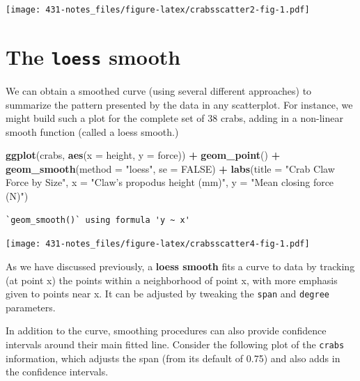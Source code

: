 \documentclass[
]{book}
\newenvironment{Shaded}{\begin{snugshade}}{\end{snugshade}}
\newcommand{\DataTypeTok}[1]{\textcolor[rgb]{0.13,0.29,0.53}{#1}}
\newcommand{\KeywordTok}[1]{\textcolor[rgb]{0.13,0.29,0.53}{\textbf{#1}}}
\newcommand{\NormalTok}[1]{#1}
\newcommand{\OperatorTok}[1]{\textcolor[rgb]{0.81,0.36,0.00}{\textbf{#1}}}
\newcommand{\OtherTok}[1]{\textcolor[rgb]{0.56,0.35,0.01}{#1}}
\newcommand{\StringTok}[1]{\textcolor[rgb]{0.31,0.60,0.02}{#1}}
\begin{document}
\texttt{[image: 431-notes\_files/figure-latex/crabsscatter2-fig-1.pdf]}

\hypertarget{loess_smooth}{%
\section{\texorpdfstring{The \texttt{loess} smooth}{The loess smooth}}\label{loess_smooth}}

We can obtain a smoothed curve (using several different approaches) to summarize the pattern presented by the data in any scatterplot. For instance, we might build such a plot for the complete set of 38 crabs, adding in a non-linear smooth function (called a loess smooth.)

\begin{Shaded}
\begin{Highlighting}[]
\KeywordTok{ggplot}\NormalTok{(crabs, }\KeywordTok{aes}\NormalTok{(}\DataTypeTok{x =}\NormalTok{ height, }\DataTypeTok{y =}\NormalTok{ force)) }\OperatorTok{+}
\StringTok{    }\KeywordTok{geom_point}\NormalTok{() }\OperatorTok{+}
\StringTok{    }\KeywordTok{geom_smooth}\NormalTok{(}\DataTypeTok{method =} \StringTok{"loess"}\NormalTok{, }\DataTypeTok{se =} \OtherTok{FALSE}\NormalTok{) }\OperatorTok{+}
\StringTok{    }\KeywordTok{labs}\NormalTok{(}\DataTypeTok{title =} \StringTok{"Crab Claw Force by Size"}\NormalTok{, }
         \DataTypeTok{x =} \StringTok{"Claw's propodus height (mm)"}\NormalTok{, }\DataTypeTok{y =} \StringTok{"Mean closing force (N)"}\NormalTok{)}
\end{Highlighting}
\end{Shaded}

\begin{verbatim}
`geom_smooth()` using formula 'y ~ x'
\end{verbatim}

\texttt{[image: 431-notes\_files/figure-latex/crabsscatter4-fig-1.pdf]}

As we have discussed previously, a \textbf{loess smooth} fits a curve to data by tracking (at point x) the points within a neighborhood of point x, with more emphasis given to points near x. It can be adjusted by tweaking the \texttt{span} and \texttt{degree} parameters.

In addition to the curve, smoothing procedures can also provide confidence intervals around their main fitted line. Consider the following plot of the \texttt{crabs} information, which adjusts the span (from its default of 0.75) and also adds in the confidence intervals.
\end{document}
